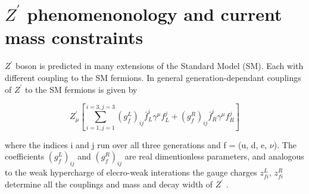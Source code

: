 \documentclass[12pt,a4paper]{article}		%
\begin{document}
\newpage 

\section{ $Z^\prime$ phenomenonology and current mass constraints }


 $Z^\prime$ boson is predicted in many extensions of the Standard Model (SM). Each with different coupling to the SM fermions. In general generation-dependant couplings of $Z^\prime$ to the SM fermions is given by 
 
 \begin{equation}
	 Z_\mu^\prime \left[ \sum_{i=1,j=1}^{i=3,j=3} \left(g_f^L \right)_{ij} \bar{f}_L^i \gamma^\mu f_L^j + \left(g_f^R \right)_{ij} \bar{f}_R^i \gamma^\mu f_R^j	  \right]
 \end{equation} 
 
 where the indices i and j run over all three generations and f = (u, d, e, $\nu$). The coefficients $\left(g_f^L \right)_{ij}$ and $\left(g_f^R \right)_{ij}$ are real dimentionless parameters, and analogous to the weak hypercharge of elecro-weak interations the gauge charges $z_{fi}^L$, $z_{fi}^R$ determine all the couplings and mass and decay width of $Z^\prime$ \cite{zphysics,zpheno2}. 
    
\end{document}
